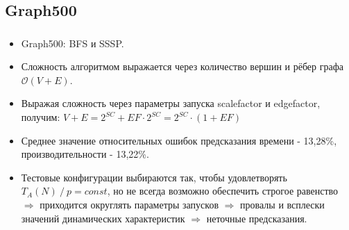 \documentclass[unicode, t, 11pt]{beamer}%
\begin{document}
		\subsection{Graph500}
		\begin{frame}
			\frametitle{\insertsection}
			\framesubtitle{\insertsubsection}
			\begin{itemize}[label = \(\bullet\)]
				\item Graph500: BFS и SSSP.
				\item Сложность алгоритмом выражается через количество вершин и рёбер графа \(\mathcal{O}(V + E)\).
				\item Выражая сложность через параметры запуска scalefactor и edgefactor, получим: \(V + E = 2^{SC} + EF \cdot 2^{SC} = 2^{SC} \cdot (1 + EF) \)
				\item Среднее значение относительных ошибок предсказания времени - 13,28\%, производительности - 13,22\%.
				\item Тестовые конфигурации выбираются так, чтобы удовлетворять \(T_A(N)\:/\:p = const\), но не всегда возможно обеспечить строгое равенство \(\Rightarrow\) приходится округлять параметры запусков \(\Rightarrow\) провалы и всплески значений динамических характеристик \(\Rightarrow\) неточные предсказания.
			\end{itemize}

		\end{frame}
\end{document}
